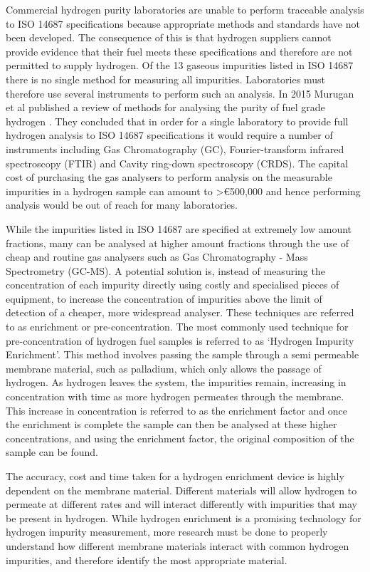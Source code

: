 Commercial hydrogen purity laboratories are unable to perform traceable analysis to ISO 14687 
specifications because appropriate methods and standards have not been developed. The consequence 
of this is that hydrogen suppliers cannot provide evidence that their fuel meets these specifications and therefore are not permitted to supply hydrogen. Of the 13 gaseous impurities listed in 
ISO 14687  there is no single method for measuring all impurities. Laboratories must therefore use 
several instruments to perform such an analysis.  In 2015 Murugan et al published a review of methods 
for analysing the purity of fuel grade hydrogen \cite{Murugan2015}. They concluded that in order for a single laboratory to provide full hydrogen analysis to ISO 14687 specifications it would require 
a number of instruments including Gas Chromatography (GC), Fourier-transform infrared spectroscopy (FTIR) and Cavity ring-down spectroscopy (CRDS). The capital cost of purchasing the gas 
analysers to perform analysis on the measurable impurities in a hydrogen sample can amount to 
>€500,000 \cite{Murugan2015} and hence performing analysis would be out of reach for many 
laboratories. 

While the impurities listed in ISO 14687 are specified at extremely low amount fractions, 
many can be analysed at higher amount fractions through the use of cheap and routine gas 
analysers such as Gas Chromatography - Mass Spectrometry (GC-MS). A potential solution is, instead of measuring the concentration of each impurity directly using costly and specialised pieces of equipment, to increase the concentration of impurities above the limit of detection of a cheaper, more widespread analyser. These techniques are referred 
to as enrichment or pre-concentration. The most commonly used technique for pre-concentration 
of hydrogen fuel samples is referred to as ‘Hydrogen Impurity Enrichment’. This method involves 
passing the sample through a semi permeable membrane material, such as palladium, which only allows the passage of hydrogen.\cite{NathanW.Ockwig2007a} As hydrogen leaves the system, the impurities remain, increasing in concentration with time as more hydrogen permeates through the membrane. This increase in concentration is referred to as the enrichment factor and once the enrichment is complete the sample can then be analysed at these higher concentrations, and using the enrichment factor, the original composition of the sample can be found. 

The accuracy, cost and time taken for a hydrogen enrichment device is highly dependent on the membrane material. Different materials will allow hydrogen to permeate at different rates and will interact differently with impurities that may be present in hydrogen.\cite{NathanW.Ockwig2007a} While hydrogen enrichment is a promising technology for hydrogen impurity measurement, more research must be done to properly understand how different membrane materials interact with common hydrogen impurities, and therefore identify the most appropriate material.

